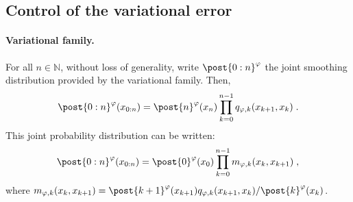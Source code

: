 \documentclass{article}
\newcommand{\Xfd}{\mathcal{X}}
\newcommand{\uksymbol}{\ell}
\newcommand{\ud}[1]{\uksymbol_{#1}}
\newcommand{\nset}{\mathbb{N}}
\newcommand{\1}{\mathbbm{1}}
\newcommand{\uk}[1]{\mathbf{L}_{#1}}
\newcommand{\tensprod}{\otimes}
\newcommand{\Xset}{\mathsf{X}}
\newcommand{\hk}{\kernel{Q}}
\newcommand{\md}[1]{g_{#1}}
\newcommand{\af}[1]{h_{#1}}
\newcommand{\kernel}[1]{\mathbf{#1}}
\newcommand{\rmd}{\ensuremath{\mathrm{d}}}
\newcommand{\eqdef}{\ensuremath{:=}}
\newcommand{\eqsp}{\;}
\begin{document}
\subsection{Control of the variational error}

\paragraph{Variational family. }
For all $n\in\nset$, without loss of generality, write $\post{0:n}^{\varphi}$ the joint smoothing distribution provided by the variational family. Then,
$$
 \post{0:n}^{\varphi}(x_{0:n})=  \post{n}^{\varphi}(x_n)\prod_{k=0}^{n-1}q_{\varphi,k}(x_{k+1},x_k)\eqsp.
$$
This joint probability distribution can be written:
$$
 \post{0:n}^{\varphi}(x_{0:n})=  \post{0}^{\varphi}(x_0)\prod_{k=0}^{n-1}m_{\varphi,k}(x_{k},x_{k+1})\eqsp,
$$
where $m_{\varphi,k}(x_{k},x_{k+1}) =   \post{k+1}^{\varphi}(x_{k+1})q_{\varphi,k}(x_{k+1},x_k)/ \post{k}^{\varphi}(x_k)$. %
\end{document}
